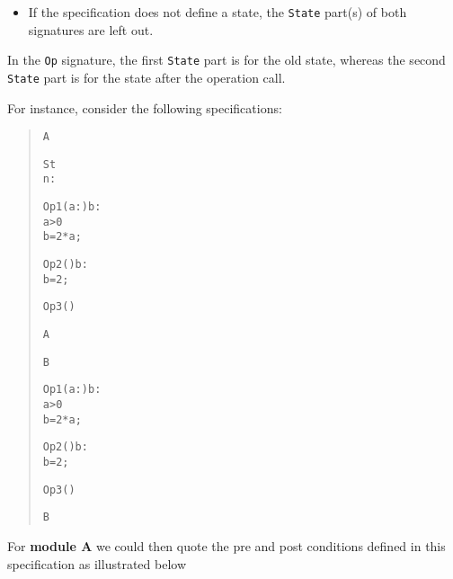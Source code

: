 \documentclass[\pformat,12pt]{article}
\begin{document}
\begin{description}
\begin{itemize}
\item If the specification does not define a state, the {\tt State} part(s)
  of both signatures are left out.
\end{itemize}

In the {\tt {}Op} signature, the first {\tt State} part is for
the old state, whereas the second {\tt State} part is for the 
state after the operation call.

For instance, consider the following specifications:

\begin{quotation}
\begin{minipage}[t]{.4\textwidth}
\begin{alltt}
 A


 St 
  n : 


Op1 (a : ) b :
 a > 0
 b = 2 * a;

Op2 () b : 
 b = 2;

Op3 ()
 

 A

\end{alltt}
\end{minipage}
\begin{minipage}[t]{.4\textwidth}
\begin{alltt}
 B



Op1 (a : ) b : 
 a > 0
 b = 2 * a;

Op2 () b : 
 b = 2;

Op3 ()
 

 B
\end{alltt}
\end{minipage}
\end{quotation}

For \textbf{module A} we could then quote the pre and post conditions
defined in this specification as illustrated below


\end{description}
\end{document}
